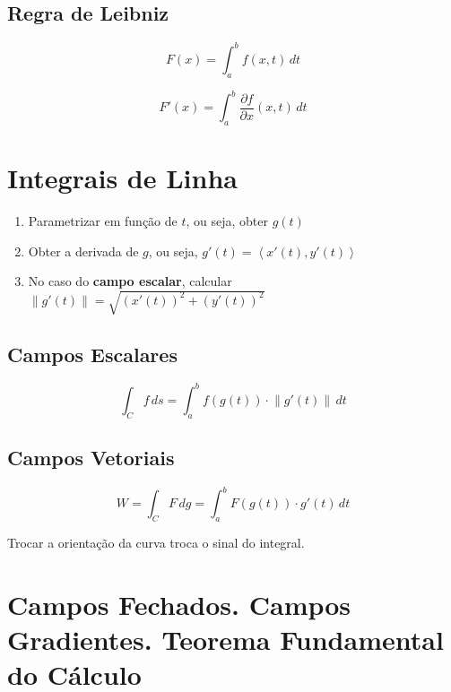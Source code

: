 \documentclass[11pt, a4paper]{article}
\begin{document}
\subsection{Regra de Leibniz}

\begin{equation*}
    F(x) = \int_{a}^{b} f(x, t) \, dt
\end{equation*}

\begin{equation*}
    F'(x) = \int_{a}^{b} \frac{\partial f}{\partial x}(x, t) \, dt
\end{equation*}

\section{Integrais de Linha}

\begin{enumerate}
    \item Parametrizar em função de $t$, ou seja, obter $g(t)$
    \item Obter a derivada de $g$, ou seja, $g'(t) = \left\langle x'(t), y'(t)\right\rangle$
    \item No caso do \textbf{campo escalar}, calcular $\left\lVert g'(t) \right\rVert = \sqrt{\left(x'(t)\right)^2 + \left(y'(t)\right)^2}$
\end{enumerate}

\subsection{Campos Escalares}

\begin{equation*}
    \int_{C} f \, ds =
    \int_{a}^{b} f\left(g(t)\right) \cdot \left\lVert g'(t) \right\rVert  \, dt
\end{equation*}

\subsection{Campos Vetoriais}

\begin{equation*}
    W = \int_{C} F \, dg =
    \int_{a}^{b} F\left(g(t)\right) \cdot g'(t) \, dt
\end{equation*}

Trocar a orientação da curva troca o sinal do integral.

\section{Campos Fechados. Campos Gradientes. Teorema Fundamental do Cálculo}
\end{document}
